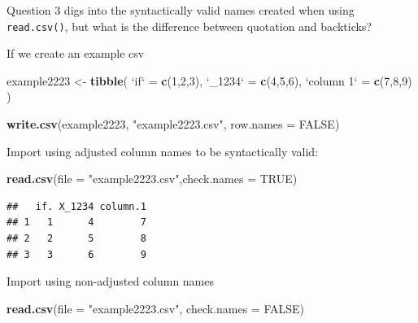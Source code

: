 \documentclass[]{book}
\newenvironment{Shaded}{\begin{snugshade}}{\end{snugshade}}
\newcommand{\DataTypeTok}[1]{\textcolor[rgb]{0.13,0.29,0.53}{#1}}
\newcommand{\DecValTok}[1]{\textcolor[rgb]{0.00,0.00,0.81}{#1}}
\newcommand{\KeywordTok}[1]{\textcolor[rgb]{0.13,0.29,0.53}{\textbf{#1}}}
\newcommand{\NormalTok}[1]{#1}
\newcommand{\OtherTok}[1]{\textcolor[rgb]{0.56,0.35,0.01}{#1}}
\newcommand{\StringTok}[1]{\textcolor[rgb]{0.31,0.60,0.02}{#1}}
\begin{document}
Question 3 digs into the syntactically valid names created when using \texttt{read.csv()}, but what is the difference between quotation and backticks?

If we create an example csv

\begin{Shaded}
\begin{Highlighting}[]
\NormalTok{example2223 <-}\StringTok{ }\KeywordTok{tibble}\NormalTok{(}
  \StringTok{`}\DataTypeTok{if}\StringTok{`}\NormalTok{ =}\StringTok{ }\KeywordTok{c}\NormalTok{(}\DecValTok{1}\NormalTok{,}\DecValTok{2}\NormalTok{,}\DecValTok{3}\NormalTok{),}
  \StringTok{`}\DataTypeTok{_1234}\StringTok{`}\NormalTok{ =}\StringTok{ }\KeywordTok{c}\NormalTok{(}\DecValTok{4}\NormalTok{,}\DecValTok{5}\NormalTok{,}\DecValTok{6}\NormalTok{),}
  \StringTok{`}\DataTypeTok{column 1}\StringTok{`}\NormalTok{ =}\StringTok{ }\KeywordTok{c}\NormalTok{(}\DecValTok{7}\NormalTok{,}\DecValTok{8}\NormalTok{,}\DecValTok{9}\NormalTok{)}
\NormalTok{)}

\KeywordTok{write.csv}\NormalTok{(example2223, }\StringTok{"example2223.csv"}\NormalTok{, }\DataTypeTok{row.names =} \OtherTok{FALSE}\NormalTok{)}
\end{Highlighting}
\end{Shaded}

Import using adjusted column names to be syntactically valid:

\begin{Shaded}
\begin{Highlighting}[]
\KeywordTok{read.csv}\NormalTok{(}\DataTypeTok{file =} \StringTok{"example2223.csv"}\NormalTok{,}\DataTypeTok{check.names =} \OtherTok{TRUE}\NormalTok{)}
\end{Highlighting}
\end{Shaded}

\begin{verbatim}
##   if. X_1234 column.1
## 1   1      4        7
## 2   2      5        8
## 3   3      6        9
\end{verbatim}

Import using non-adjusted column names

\begin{Shaded}
\begin{Highlighting}[]
\KeywordTok{read.csv}\NormalTok{(}\DataTypeTok{file =} \StringTok{"example2223.csv"}\NormalTok{, }\DataTypeTok{check.names =} \OtherTok{FALSE}\NormalTok{)}
\end{Highlighting}
\end{Shaded}
\end{document}
